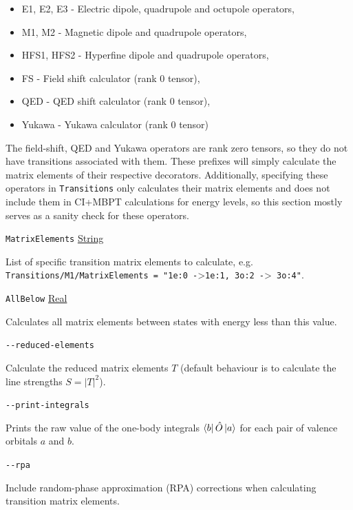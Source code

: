 \documentclass{report}
\begin{document}
\begin{itemize}
\item E1, E2, E3 - Electric dipole, quadrupole and octupole operators,
\item M1, M2 - Magnetic dipole and quadrupole operators,
\item HFS1, HFS2 - Hyperfine dipole and quadrupole operators,
\item FS - Field shift calculator (rank 0 tensor),
\item QED - QED shift calculator (rank 0 tensor),
\item Yukawa - Yukawa calculator (rank 0 tensor)
\end{itemize}

The field-shift, QED and Yukawa operators are rank zero tensors, so they do not have transitions
associated with them. These prefixes will simply calculate the matrix elements of their respective
decorators. Additionally, specifying these operators in \texttt{Transitions} only calculates their
matrix elements and does not include them in CI+MBPT calculations for energy levels, so this
section mostly serves as a sanity check for these operators.

\texttt{MatrixElements} \uline{String}
\begin{adjustwidth}{1cm}{}
List of specific transition matrix elements to calculate, e.g.
\texttt{Transitions/M1/MatrixElements = "1e:0 -}\textgreater \texttt{1e:1, 3o:2 -}\textgreater\texttt{ 3o:4"}.
\end{adjustwidth}

\texttt{AllBelow} \uline{Real}
\begin{adjustwidth}{1cm}{}
Calculates all matrix elements between states with energy less than this value.
\end{adjustwidth}

\texttt{{-}{-}reduced-elements} 
\begin{adjustwidth}{1cm}{}
Calculate the reduced matrix elements $T$ (default behaviour is to calculate the line strengths 
$S = |T|^2$).
\end{adjustwidth}

\texttt{{-}{-}print-integrals} 
\begin{adjustwidth}{1cm}{}
Prints the raw value of the one-body integrals $\bra{b}\hat{O}\ket{a}$ for each pair of valence 
orbitals $a$ and $b$.
\end{adjustwidth}

\texttt{{-}{-}rpa}
\begin{adjustwidth}{1cm}{}
Include random-phase approximation (RPA) corrections when calculating transition matrix elements. 
\end{adjustwidth}
\end{document}
